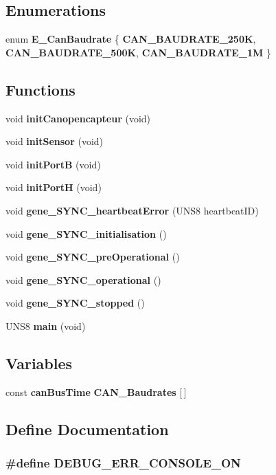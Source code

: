\subsection*{Enumerations}
\begin{CompactItemize}
\item 
enum {\bf E\_\-Can\-Baudrate} \{ {\bf CAN\_\-BAUDRATE\_\-250K}, 
{\bf CAN\_\-BAUDRATE\_\-500K}, 
{\bf CAN\_\-BAUDRATE\_\-1M}
 \}
\end{CompactItemize}
\subsection*{Functions}
\begin{CompactItemize}
\item 
void {\bf init\-Canopencapteur} (void)
\item 
void {\bf init\-Sensor} (void)
\item 
void {\bf init\-Port\-B} (void)
\item 
void {\bf init\-Port\-H} (void)
\item 
void {\bf gene\_\-SYNC\_\-heartbeat\-Error} (UNS8 heartbeat\-ID)
\item 
void {\bf gene\_\-SYNC\_\-initialisation} ()
\item 
void {\bf gene\_\-SYNC\_\-pre\-Operational} ()
\item 
void {\bf gene\_\-SYNC\_\-operational} ()
\item 
void {\bf gene\_\-SYNC\_\-stopped} ()
\item 
UNS8 {\bf main} (void)
\end{CompactItemize}
\subsection*{Variables}
\begin{CompactItemize}
\item 
const {\bf can\-Bus\-Time} {\bf CAN\_\-Baudrates} [$\,$]
\end{CompactItemize}


\subsection{Define Documentation}
\subsubsection{\setlength{\rightskip}{0pt plus 5cm}\#define DEBUG\_\-ERR\_\-CONSOLE\_\-ON}\label{appli_8c_bb416887a32f7e4333e095356774f07f}


